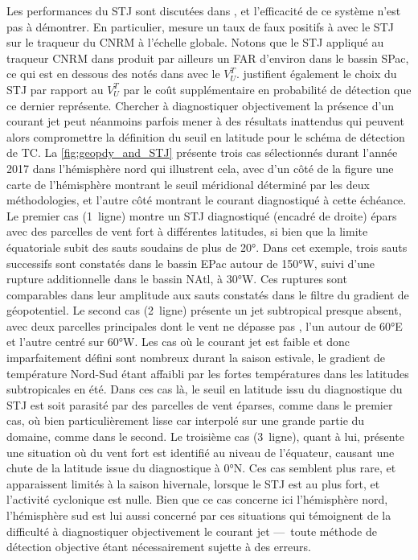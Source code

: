 \documentclass[../main.tex]{subfiles}
\begin{document}
Les performances du STJ sont discutées dans \cite{bourdin_intercomparison_2022}, et l'efficacité de ce système n'est pas à démontrer. En particulier,
\cite{bourdin_intercomparison_2022} mesure un taux de faux positifs à  avec le STJ sur le traqueur du CNRM à l'échelle globale. Notons que le STJ
appliqué au traqueur CNRM dans \cite{bourdin_intercomparison_2022} produit par ailleurs un FAR d'environ  dans le bassin SPac, ce qui est en dessous
des  notés dans \cite{dulac_assessing_2023} avec le $V_U^T$. \cite{bourdin_intercomparison_2022} justifient également le choix du STJ par rapport au
$V_U^T$ par le coût supplémentaire en probabilité de détection que ce dernier représente. Chercher à diagnostiquer objectivement la présence d'un courant jet
peut néanmoins parfois mener à des résultats inattendus qui peuvent alors compromettre la définition du seuil en latitude pour le schéma de détection de TC. La
\cref{fig:geopdy_and_STJ} présente trois cas sélectionnés durant l'année 2017 dans l'hémisphère nord qui illustrent cela, avec d'un côté de la figure une carte
de l'hémisphère montrant le seuil méridional déterminé par les deux méthodologies, et l'autre côté montrant le courant diagnostiqué à cette échéance. Le premier
cas (1\iere~ligne) montre un STJ diagnostiqué (encadré de droite) épars avec des parcelles de vent fort à différentes latitudes, si bien que la limite
équatoriale subit des sauts soudains de plus de \ang{20}. Dans cet exemple, trois sauts successifs sont constatés dans le bassin EPac autour de \ang{150}W,
suivi d'une rupture additionnelle dans le bassin NAtl, à \ang{30}W. Ces ruptures sont comparables dans leur amplitude aux sauts constatés dans le filtre du
gradient de géopotentiel. Le second cas (2\ieme~ligne) présente un jet subtropical presque absent, avec deux parcelles principales dont le vent ne dépasse pas
, l'un autour de \ang{60}E et l'autre centré sur \ang{60}W. Les cas où le courant jet est faible et donc imparfaitement défini sont nombreux durant la
saison estivale, le gradient de température Nord-Sud étant affaibli par les fortes températures dans les latitudes subtropicales en été. Dans ces cas là, le
seuil en latitude issu du diagnostique du STJ est soit parasité par des parcelles de vent éparses, comme dans le premier cas, où bien particulièrement lisse car
interpolé sur une grande partie du domaine, comme dans le second. Le troisième cas (3\ieme~ligne), quant à lui, présente une situation où du vent fort est
identifié au niveau de l'équateur, causant une chute de la latitude issue du diagnostique à \ang{0}N. Ces cas semblent plus rare, et apparaissent limités à la
saison hivernale, lorsque le STJ est au plus fort, et l'activité cyclonique est nulle. Bien que ce cas concerne ici l'hémisphère nord, l'hémisphère sud est lui
aussi concerné par ces situations qui témoignent de la difficulté à diagnostiquer objectivement le courant jet ---~toute méthode de détection objective étant
nécessairement sujette à des erreurs.
\end{document}
